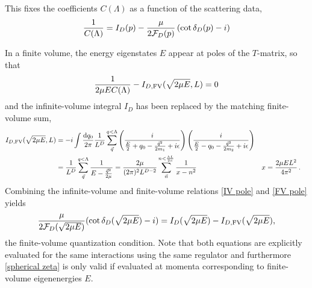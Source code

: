 This fixes the coefficients $C(\Lambda)$ as a function of the scattering data,
\begin{equation}\label{eq:IV pole}
    \frac{1}{C(\Lambda)}
    =
    I_D(p) - \frac{\mu}{2 \mathcal{F}_{D}(p)}\left(\cot \delta_{D}(p) - i\right)
\end{equation}

In a finite volume, the energy eigenstates $E$ appear at poles of the $T$-matrix, so that
\begin{equation}\label{eq:FV pole}
    \frac{1}{2\mu E C(\Lambda) } - I_{D, \textrm{FV}}(\sqrt{2\mu E},L) = 0
\end{equation}
and the infinite-volume integral $I_D$ has been replaced by the matching finite-volume sum,
\begin{align}
I_{D,\textrm{FV}}(\sqrt{2\mu E},L)
    &=-i\int \frac { \mathrm {d}q_0}{2\pi} \frac{1}{L^D}\sum_{\vec{q}}^{q < \Lambda} \left( \frac { i } { \frac{E}{2} + q _ { 0 } - \frac{\vec{q}^2}{2m_1} + i \epsilon } \right) \left( \frac { i } { \frac{E}{2} - q _ { 0 } - \frac{\vec{q}^2}{2m_2} + i \epsilon } \right)
    \\
    \label{eq:I0 FV}
    &=\frac{1}{L^D}\sum_{\vec{q}}^{q < \Lambda} \frac { 1 } { E - \frac{\vec{q}^2}{2\mu} }
    =\frac{2\mu}{(2\pi)^2 L^{D-2}} \sum_{\vec{n}}^{n < \frac{\Lambda L}{2\pi}} \frac{1}{x-n^2}
    &
    x &= \frac{2\mu E L^2}{4\pi^2}
    \, .
\end{align}
Combining the infinite-volume and finite-volume relations \eqref{IV pole} and \eqref{FV pole} yields
\begin{equation}\label{eq:spherical zeta}
    \frac{\mu}{2\mathcal{F}_{D}(\sqrt{2\mu E})}(\cot\delta_{D}(\sqrt{2\mu E})-i) = I_D(\sqrt{2\mu E}) - I_{D,\textrm{FV}}(\sqrt{2\mu E}),
\end{equation}
the finite-volume quantization condition.
Note that both equations are explicitly evaluated for the same interactions using the same regulator and furthermore \eqref{spherical zeta} is only valid if evaluated at momenta corresponding to finite-volume eigenenergies $E$.

